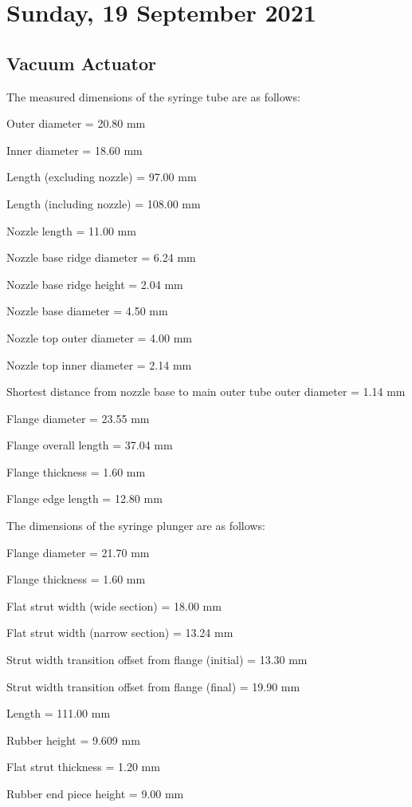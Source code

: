 \pendsign

\section[2021/09/19]{Sunday, 19 September 2021}

\subsection{Vacuum Actuator}

The measured dimensions of the syringe tube are as follows:

\begin{compactitem}
	\item Outer diameter = 20.80 mm
	\item Inner diameter = 18.60 mm
	\item Length (excluding nozzle) = 97.00 mm
	\item Length (including nozzle) = 108.00 mm
	\item Nozzle length = 11.00 mm
	\item Nozzle base ridge diameter = 6.24 mm
	\item Nozzle base ridge height = 2.04 mm
	\item Nozzle base diameter = 4.50 mm
	\item Nozzle top outer diameter = 4.00 mm
	\item Nozzle top inner diameter = 2.14 mm
	\item Shortest distance from nozzle base to main outer tube outer diameter = 1.14 mm
	\item Flange diameter = 23.55 mm
	\item Flange overall length = 37.04 mm
	\item Flange thickness = 1.60 mm
	\item Flange edge length = 12.80 mm
\end{compactitem}

The dimensions of the syringe plunger are as follows:

\begin{compactitem}
	\item Flange diameter = 21.70 mm
	\item Flange thickness = 1.60 mm
	\item Flat strut width (wide section) = 18.00 mm
	\item Flat strut width (narrow section) = 13.24 mm
	\item Strut width transition offset from flange (initial) = 13.30 mm
	\item Strut width transition offset from flange (final) = 19.90 mm
	\item Length = 111.00 mm
	\item Rubber height = 9.609 mm 
	\item Flat strut thickness = 1.20 mm
	\item Rubber end piece height = 9.00 mm
\end{compactitem}

